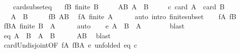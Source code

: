 \begin{isabellebody}
\ \ \isamarkupfalse%
\isanewline
{}\isamarkupfalse%
%
\endisatagproof
{\isafoldproof}%
%
\isadelimproof
\isanewline
%
\endisadelimproof
\isanewline
{}\isamarkupfalse%
\ card{\isacharunderscore}{\kern0pt}subset{\isacharunderscore}{\kern0pt}eq{\isacharcolon}{\kern0pt}\isanewline
\ \ \ fB{\isacharcolon}{\kern0pt}\ {\isachardoublequoteopen}finite\ B{\isachardoublequoteclose}\isanewline
\ \ \ \ \ AB{\isacharcolon}{\kern0pt}\ {\isachardoublequoteopen}A\ {\isasymsubseteq}\ B{\isachardoublequoteclose}\isanewline
\ \ \ \ \ c{\isacharcolon}{\kern0pt}\ {\isachardoublequoteopen}card\ A\ {\isacharequal}{\kern0pt}\ card\ B{\isachardoublequoteclose}\isanewline
\ \ \ {\isachardoublequoteopen}A\ {\isacharequal}{\kern0pt}\ B{\isachardoublequoteclose}\isanewline
%
\isadelimproof
%
\endisadelimproof
%
\isatagproof
{}\isamarkupfalse%
\ {\isacharminus}{\kern0pt}\isanewline
\ \ \isamarkupfalse%
\ fB\ AB\ \isamarkupfalse%
\ fA{\isacharcolon}{\kern0pt}\ {\isachardoublequoteopen}finite\ A{\isachardoublequoteclose}\isanewline
\ \ \ \ \isamarkupfalse%
\ {\isacharparenleft}{\kern0pt}auto\ intro{\isacharcolon}{\kern0pt}\ finite{\isacharunderscore}{\kern0pt}subset{\isacharparenright}{\kern0pt}\isanewline
\ \ \isamarkupfalse%
\ fA\ fB\ \isamarkupfalse%
\ fBA{\isacharcolon}{\kern0pt}\ {\isachardoublequoteopen}finite\ {\isacharparenleft}{\kern0pt}B\ {\isacharminus}{\kern0pt}\ A{\isacharparenright}{\kern0pt}{\isachardoublequoteclose}\isanewline
\ \ \ \ \isamarkupfalse%
\ auto\isanewline
\ \ \isamarkupfalse%
\ e{\isacharcolon}{\kern0pt}\ {\isachardoublequoteopen}A\ {\isasyminter}\ {\isacharparenleft}{\kern0pt}B\ {\isacharminus}{\kern0pt}\ A{\isacharparenright}{\kern0pt}\ {\isacharequal}{\kern0pt}\ {\isacharbraceleft}{\kern0pt}{\isacharbraceright}{\kern0pt}{\isachardoublequoteclose}\isanewline
\ \ \ \ \isamarkupfalse%
\ blast\isanewline
\ \ \isamarkupfalse%
\ eq{\isacharcolon}{\kern0pt}\ {\isachardoublequoteopen}A\ {\isasymunion}\ {\isacharparenleft}{\kern0pt}B\ {\isacharminus}{\kern0pt}\ A{\isacharparenright}{\kern0pt}\ {\isacharequal}{\kern0pt}\ B{\isachardoublequoteclose}\isanewline
\ \ \ \ \isamarkupfalse%
\ AB\ \isamarkupfalse%
\ blast\isanewline
\ \ \isamarkupfalse%
\ card{\isacharunderscore}{\kern0pt}Un{\isacharunderscore}{\kern0pt}disjoint{\isacharbrackleft}{\kern0pt}OF\ fA\ fBA\ e{\isacharcomma}{\kern0pt}\ unfolded\ eq\ c{\isacharbrackright}{\kern0pt}\ \isamarkupfalse%

\end{isabellebody}

